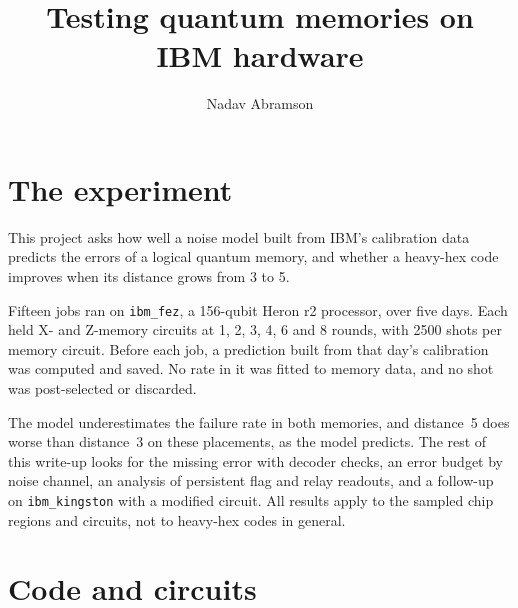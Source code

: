 \documentclass[aps,pra,reprint,nofootinbib,longbibliography,floatfix]{revtex4-2}
\begin{document}
\title{Testing quantum memories on IBM hardware}
\author{Nadav Abramson}
\maketitle

\section{The experiment}

This project asks how well a noise model built from IBM's calibration data predicts the errors of a logical quantum memory, and whether a heavy-hex code improves when its distance grows from 3 to 5.

Fifteen jobs ran on \texttt{ibm\_fez}, a 156-qubit Heron r2 processor, over five days.
Each held X- and Z-memory circuits at 1, 2, 3, 4, 6 and 8 rounds, with 2500 shots per memory circuit.
Before each job, a prediction built from that day's calibration was computed and saved.
No rate in it was fitted to memory data, and no shot was post-selected or discarded.

The model underestimates the failure rate in both memories, and distance~5 does worse than distance~3 on these placements, as the model predicts.
The rest of this write-up looks for the missing error with decoder checks, an error budget by noise channel, an analysis of persistent flag and relay readouts, and a follow-up on \texttt{ibm\_kingston} with a modified circuit.
All results apply to the sampled chip regions and circuits, not to heavy-hex codes in general.

\section{Code and circuits}
\end{document}
